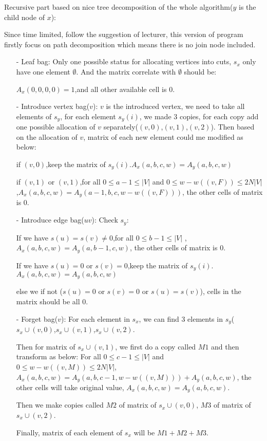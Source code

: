 \noindent Recursive part based on nice tree decomposition of the whole algorithm($y$ is the child node of $x$):

\noindent Since time limited, follow the suggestion of lecturer, this version of program firstly focus on path decomposition which means there is no join node included.
\begin{itemize}
\item[-] Leaf bag:
Only one possible status for allocating vertices into cuts, $s_x$ only have one element $\emptyset$. And the matrix correlate with $\emptyset$ should be: 

\noindent $A_x(0,0,0,0)=1$,and all other available cell is 0. 
\item[-] Introduce vertex bag($v$):
$v$ is the introduced vertex, we need to take all elements of $s_y$, for each element $s_y(i)$, we made 3 copies, for each copy add one possible allocation of $v$ separately($(v,0)$,$(v,1)$,$(v,2)$). Then based on the allocation of $v$, matrix of each new element could me modified as below:

\noindent if $(v,0)$,keep the matrix of $s_y(i)$.$A_x(a,b,c,w)=A_y(a,b,c,w)$

\noindent if $(v,1)$ or $(v,1)$,for all $0\leq a-1 \leq |V|$ and $0\leq w-w((v,F)) \leq  2N|V|$,$A_x(a,b,c,w)=A_y(a-1,b,c,w-w((v,F)))$, the other cells of matrix is 0.

\item[-] Introduce edge bag($uv$):
Check $s_y$:

\noindent If we have $s(u)=s(v)\neq 0$,for all $0\leq b-1 \leq |V|$ ,$A_x(a,b,c,w)=A_y(a,b-1,c,w)$, the other cells of matrix is 0.

\noindent If we have $s(u)=0$ or $s(v)=0$,keep the matrix of $s_y(i)$.$A_x(a,b,c,w)=A_y(a,b,c,w)$

\noindent else we if not ($s(u)=0$ or $s(v)=0$ or $s(u)=s(v)$), cells in the matrix should be all 0.

\item[-] Forget bag($v$):
For each element in $s_x$, we can find 3 elements in $s_y$($s_x\cup (v,0)$,$s_x\cup (v,1)$,$s_x\cup (v,2)$.

\noindent Then for matrix of $s_x\cup (v,1)$, we first do a copy called $M1$ and then transform as below:
For all $0\leq c-1 \leq |V|$ and $0\leq w-w((v,M)) \leq  2N|V|$,$A_x(a,b,c,w)=A_y(a,b,c-1,w-w((v,M)))+A_y(a,b,c,w)$, the other cells will take original value, $A_x(a,b,c,w)=A_y(a,b,c,w)$.

\noindent Then we make copies called $M2$ of matrix of $s_x\cup (v,0)$, $M3$ of matrix of $s_x\cup (v,2)$.

\noindent Finally, matrix of each element of $s_x$ will be $M1+M2+M3$.

\end{itemize}
